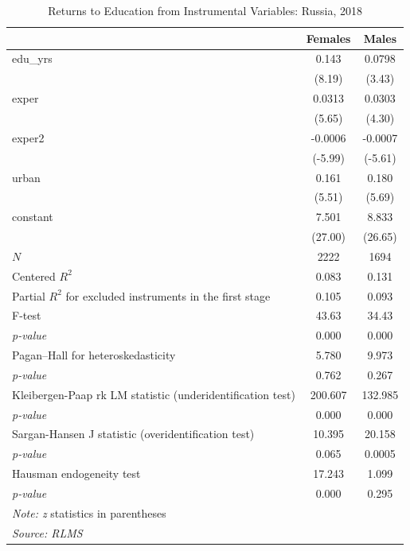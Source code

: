 \documentclass[a4paper,12pt,twoside]{book}
\begin{document}
\begin{table}[H]\centering
	\caption{Returns to Education from Instrumental Variables: Russia, 2018}
	\begin{tabular}{l*{2}{c}}
		\hline\hline
		&\multicolumn{1}{c}{Females}&\multicolumn{1}{c}{Males}\\
		\hline
		edu\_yrs   &    0.143&   0.0798\\
		&   (8.19)&   (3.43)\\
		exper     &   0.0313&   0.0303\\
		&   (5.65)&   (4.30)\\
		exper2    &-0.0006 &-0.0007\\
		&  (-5.99)&  (-5.61)\\
		urban     &    0.161&    0.180\\
		&   (5.51)&   (5.69)\\
		constant    &    7.501&    8.833\\
		&  (27.00)&  (26.65)\\
		\hline
		\(N\)     &     2222 &     1694\\
		Centered $R^2$  & 0.083   & 0.131 \\
		Partial $R^2$ for excluded instruments in the first stage   & 0.105   &  0.093 \\
		F-test  &  43.63  &  34.43 \\
		\textit{p-value}  &  0.000  & 0.000 \\
		Pagan–Hall for heteroskedasticity  &  5.780   & 9.973 \\
		\textit{p-value}  & 0.762  & 0.267 \\
		Kleibergen-Paap rk LM statistic (underidentification test)  &  200.607  & 132.985 \\
		\textit{p-value}  &  0.000  & 0.000 \\
		Sargan-Hansen J statistic (overidentification test)  & 10.395   & 20.158 \\
		\textit{p-value}  & 0.065   & 0.0005 \\
		Hausman endogeneity test  & 17.243   & 1.099 \\
		\textit{p-value}  & 0.000   & 0.295 \\
		
		\hline\hline
		\multicolumn{3}{l}{\footnotesize  \textit{Note: z} statistics in parentheses}\\
		\multicolumn{3}{l}{\footnotesize  \textit{Source: RLMS} }\\
	\end{tabular}
\end{table}
\end{document}
